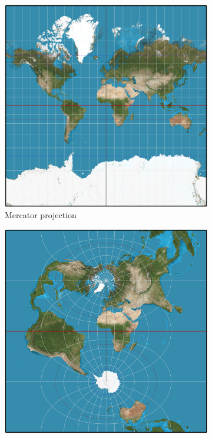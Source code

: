 \begin{figure}[!htb]
  \centering
  \begin{subfigure}[b]{0.4\textwidth}
    \includegraphics[width=\textwidth]{images/methods/projections/mercator.png}
    \caption[
        Mercator projection, Urldate: 07.2016 \newline
 \small\texttt{\url{https://upload.wikimedia.org/wikipedia/commons/f/f0/MercNormSph.png}}.
    ]{Mercator projection}
    \label{fig:projections-mercator}
  \end{subfigure}
  \hfill
  \begin{subfigure}[b]{0.4\textwidth}
    \includegraphics[width=\textwidth]{images/methods/projections/mercator-transverse.png}

\end{subfigure}
\end{figure}
